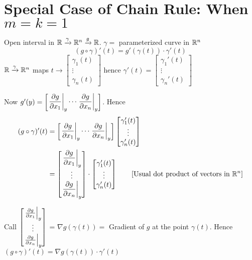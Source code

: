\section{Special Case of Chain Rule: When \texorpdfstring{$m=k=1$}{m=k=1}}
Open interval in $\mathbb{R}\xrightarrow{\gamma}\mathbb{R}^n\xrightarrow{g}\mathbb{R}$. $\gamma=$ parameterized curve in $\mathbb{R}^n$
$$(g\circ \gamma)'(t)=g'(\gamma(t))\cdot \gamma'(t)$$ ${\mathbb{R}\xrightarrow{\gamma}\mathbb{R}^n}$ maps $t\to\begin{bmatrix}\gamma_1(t)\\ \vdots\\ \gamma_n(t)	\end{bmatrix}$ hence $\gamma'(t)=\begin{bmatrix}
		\gamma_1'(t) \\ \vdots\\ \gamma_n'(t)
	\end{bmatrix}$

Now $g'(y)=\begin{bmatrix}
		\left.\dfrac{\partial g}{\partial x_1}\right|_y\cdots \left.\dfrac{\partial g}{\partial x_n}\right|_y
	\end{bmatrix}$. Hence \begin{align*}
	(g\circ \gamma)'(t) & = \begin{bmatrix}
		                        \left.\dfrac{\partial g}{\partial x_1}\right|_y\cdots \left.\dfrac{\partial g}{\partial x_n}\right|_y
	                        \end{bmatrix}\begin{bmatrix}
		                                     \gamma_1'(t) \\ \vdots\\ \gamma_n'(t)
	                                     \end{bmatrix}                                  \\
	                    & = \begin{bmatrix}
		                        \left.\dfrac{\partial g}{\partial x_1}\right|_y \\ \vdots \\ \left.\dfrac{\partial g}{\partial x_n}\right|_y
	                        \end{bmatrix}\cdot \begin{bmatrix}
		                                           \gamma_1'(t) \\ \vdots\\ \gamma_n'(t)
	                                           \end{bmatrix}\qquad[\text{Usual dot product of vectors in }\mathbb{R}^n] \\
\end{align*}
\pagebreak

Call $\begin{bmatrix}
		\left.\frac{\partial g}{\partial x_1}\right|_y \\ \vdots \\ \left.\frac{\partial g}{\partial x_n}\right|_y
	\end{bmatrix}$ = $\nabla g(\gamma(t))=$ Gradient of $g$ at the point $\gamma(t)$. Hence $(g\circ\gamma)'(t)=\nabla g(\gamma(t))\cdot\gamma'(t)$


